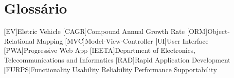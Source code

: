 \chapter{Glossário}

\footnotesize
\SingleSpacing

\begin{multicols}{2}
\begin{acronym}[AAAAAA]

	[EV]{Eletric Vehicle}
	[CAGR]{Compound Annual Growth Rate}
	[ORM]{Object-Relational Mapping}
	[MVC]{Model-View-Controller}
	[UI]{User Interface}
	[PWA]{Progressive Web App}
	[IEETA]{Department of Electronics, Telecommunications and Informatics}
	[RAD]{Rapid Application Development}
	[FURPS]{Functionality Usability Reliability Performance Supportability}
	

\end{acronym}
\end{multicols}

